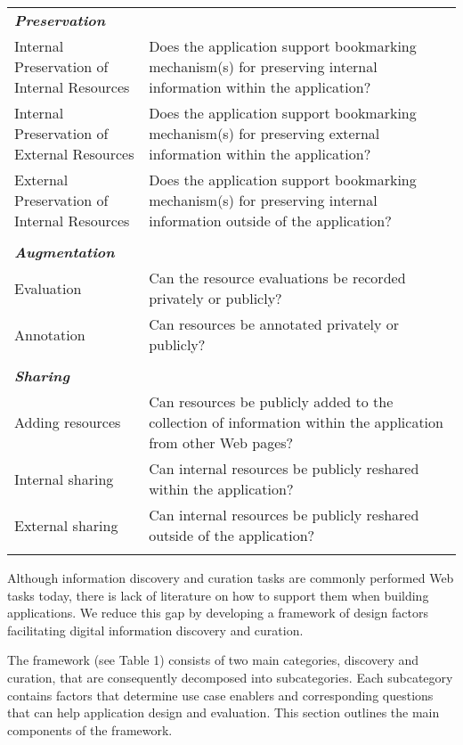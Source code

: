 \documentclass{casconpaper}
\begin{document}
{\begin{table*}[htbp]
\begin{tabular}{|p{0.30\linewidth}|p{0.70\linewidth}|}
\emph{\textbf{Preservation}}                   &                                                                                                           \\
Internal Preservation of Internal Resources       & Does the application support bookmarking mechanism(s) for preserving internal information within the application?        \\
Internal Preservation of External Resources       & Does the application support bookmarking mechanism(s) for preserving external information within the application?        \\
External Preservation of Internal Resources      & Does the application support bookmarking mechanism(s) for preserving internal information outside of the application? \\ 
&\\
\emph{\textbf{Augmentation}}            &                                                                                                           \\
Evaluation                   & Can the resource evaluations be recorded privately or publicly? \\
Annotation                   & Can resources be annotated privately or publicly?                                                                               \\    
&\\        
\emph{\textbf{Sharing}}            &                                                                                                           \\
Adding resources             & Can resources be publicly added to the collection of information within the application from other Web pages?     \\
Internal sharing         & Can internal resources be publicly reshared within the application?         \\ 
External sharing          & Can internal resources be publicly reshared outside of the application?         \\ 
&\\           
\hline
\end{tabular}
\end{table*}

Although information discovery and curation tasks are commonly performed Web tasks today, there is lack of literature on how to support them when building applications. We reduce this gap by developing a framework of design factors facilitating digital information discovery and curation. 

The framework (see Table 1) consists of two main categories, discovery and curation, that are consequently decomposed into subcategories. Each subcategory contains factors that determine use case enablers and corresponding questions that can help application design and evaluation. This section outlines the main components of the framework.

} %
\end{document}
